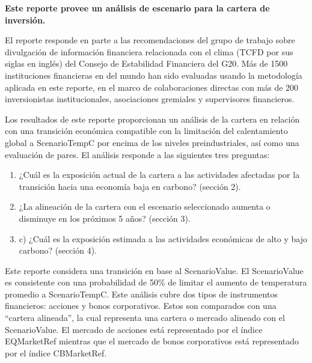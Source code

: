 \documentclass[10pt,table]{article}\usepackage[]{graphicx}\usepackage[]{color}
\begin{document}
	\begin{multicols}{2}
		\textbf{Este reporte provee un análisis de escenario para la cartera de inversión. } 
		
		El reporte responde en parte a las recomendaciones del grupo de trabajo sobre divulgación de información financiera relacionada con el clima (TCFD por sus siglas en inglés) del Consejo de Estabilidad Financiera del G20. Más de 1500 instituciones financieras en del mundo han sido evaluadas usando la metodología aplicada en este reporte, en el marco de colaboraciones directas con más de 200 inversionistas institucionales, asociaciones gremiales y supervisores financieros.
		
		Los resultados de este reporte proporcionan un análisis de la cartera en relación con una transición económica compatible con la limitación del calentamiento global a ScenarioTemp\degree C por encima de los niveles preindustriales, así como una evaluación de pares. El análisis responde a las siguientes tres preguntas:
		
		\begin{enumerate}
			\item{¿Cuál es la exposición actual de la cartera a las actividades afectadas por la transición hacia una economía baja en carbono? (sección 2).}
			\item{¿La alineación de la cartera con el escenario seleccionado aumenta o disminuye en los próximos 5 años? (sección 3).}
			\item{c)	¿Cuál es la exposición estimada a las actividades económicas de alto y bajo carbono? (sección 4).}
		\end{enumerate}
		
		Este reporte considera una transición en base al ScenarioValue. El ScenarioValue es consistente con una probabilidad de 50\%  de limitar el aumento de temperatura promedio a ScenarioTemp\degree C. Este análisis cubre dos tipos de instrumentos financieros: acciones y bonos corporativos. Estos son comparados con una “cartera alineada”, la cual representa una cartera o mercado alineado con el ScenarioValue. El mercado de acciones está representado por el índice EQMarketRef mientras que el mercado de bonos corporativos está representado por el índice CBMarketRef. \columnbreak
		
		
		

\end{multicols}
\end{document}
